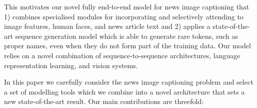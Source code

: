 This motivates our novel fully end-to-end
model for news image captioning that 1) combines specialised modules for
incorporating and selectively attending to image features, human faces, and
news article text and
2) applies a state-of-the-art sequence generation model which is able to
generate rare tokens, such as proper names, even when they do not form part of
the
training data. Our model relies on a novel combination of sequence-to-sequence
architectures, language representation learning, and
vision systems.







In this paper we carefully consider the news image captioning problem and
select a set of modelling tools which we combine into a novel architecture that
sets a new state-of-the-art result. Our main contributions are threefold:


